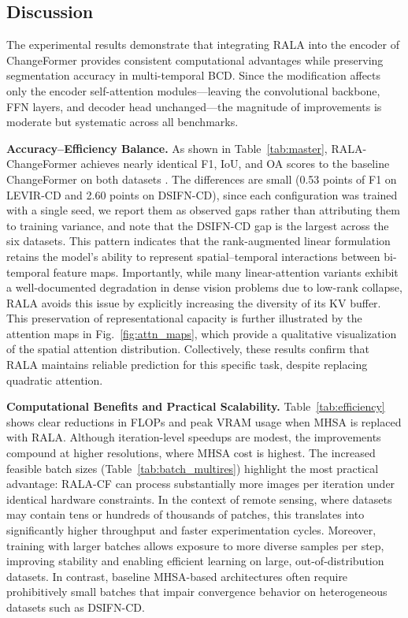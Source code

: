 \documentclass[runningheads]{llncs}
\newcommand{\journal}[1]{{\color{orange}#1}}
\begin{document}
\subsection{Discussion}
\label{sec:discussion}

The experimental results demonstrate that integrating RALA into the encoder of
ChangeFormer provides consistent computational advantages while preserving
segmentation accuracy in multi-temporal BCD. Since the modification affects only
the encoder self-attention modules—leaving the convolutional backbone, FFN
layers, and decoder head unchanged—the magnitude of improvements is moderate
but systematic across all benchmarks.

\noindent \textbf{Accuracy–Efficiency Balance.}
As shown in Table~\ref{tab:master}, RALA-ChangeFormer achieves nearly
identical F1, IoU, and OA scores to the baseline ChangeFormer on both datasets
\cite{Zheng2020LEVIR,Zhang2020FusionNetDSIFN}. \journal{The differences are
small (0.53 points of F1 on LEVIR-CD and 2.60 points on DSIFN-CD), since each
configuration was trained with a single seed, we report them as observed gaps
rather than attributing them to training variance, and note that the DSIFN-CD
gap is the largest across the six datasets. This pattern} indicates that the
rank-augmented linear formulation retains the
model's ability to represent spatial–temporal interactions between bi-temporal
feature maps. Importantly, while many linear-attention variants
\cite{Choromanski2021Performer,Wang2020Linformer,Xiong2021Nystromformer} exhibit
a well-documented degradation in dense vision problems due to low-rank collapse,
RALA avoids this issue by explicitly increasing the diversity of its KV buffer.
This preservation of representational capacity is further illustrated by the
attention maps in Fig.~\ref{fig:attn_maps}, which provide a qualitative
visualization of the spatial attention distribution. Collectively, these results
confirm that RALA maintains reliable prediction for this specific task, despite
replacing quadratic attention.


\noindent \textbf{Computational Benefits and Practical Scalability.}
Table~\ref{tab:efficiency} shows clear reductions in FLOPs and peak VRAM usage
when MHSA is replaced with RALA. Although iteration-level speedups are modest,
the improvements compound at higher resolutions, where MHSA cost is highest.
The increased feasible batch sizes (Table~\ref{tab:batch_multires}) highlight
the most practical advantage: RALA-CF can process substantially more images per
iteration under identical hardware constraints. In the context of remote
sensing, where datasets may contain tens or hundreds of thousands of patches,
this translates into significantly higher throughput and faster experimentation
cycles. Moreover, training with larger batches allows exposure to more diverse
samples per step, improving stability and enabling efficient learning on large,
out-of-distribution datasets. In contrast, baseline MHSA-based architectures
often require prohibitively small batches that impair convergence behavior on
heterogeneous datasets such as DSIFN-CD.
\end{document}
